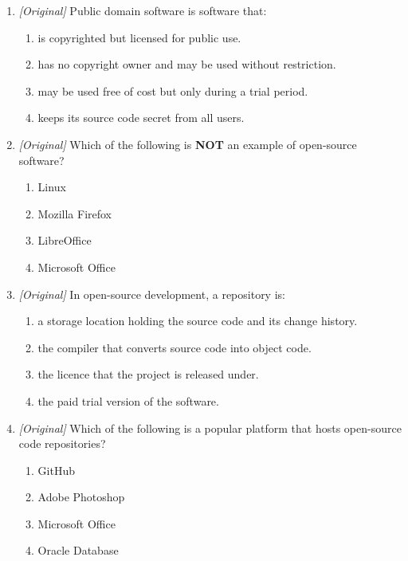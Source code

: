 \begin{enumerate}[label=\textbf{Q\arabic*.}, leftmargin=*]
\begin{enumerate}[label=\Alph*.]
    \item Both terms mean exactly the same thing.
    \item Freeware always includes the source code; free software never does.
  \end{enumerate}
\item \textit{[Original]} Public domain software is software that:
  \begin{enumerate}[label=\Alph*.]
    \item is copyrighted but licensed for public use.
    \item has no copyright owner and may be used without restriction.
    \item may be used free of cost but only during a trial period.
    \item keeps its source code secret from all users.
  \end{enumerate}
\item \textit{[Original]} Which of the following is \textbf{NOT} an example of
  open-source software?
  \begin{enumerate}[label=\Alph*.]
    \item Linux
    \item Mozilla Firefox
    \item LibreOffice
    \item Microsoft Office
  \end{enumerate}
\item \textit{[Original]} In open-source development, a repository is:
  \begin{enumerate}[label=\Alph*.]
    \item a storage location holding the source code and its change history.
    \item the compiler that converts source code into object code.
    \item the licence that the project is released under.
    \item the paid trial version of the software.
  \end{enumerate}
\item \textit{[Original]} Which of the following is a popular platform that
  hosts open-source code repositories?
  \begin{enumerate}[label=\Alph*.]
    \item GitHub
    \item Adobe Photoshop
    \item Microsoft Office
    \item Oracle Database
  \end{enumerate}

\end{enumerate}
